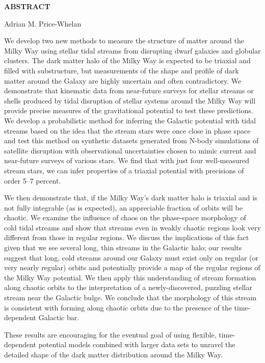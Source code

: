 \thispagestyle{empty}
\begin{center}

{\Large \bf ABSTRACT}

\vspace{.35in}
{\large \bf \thesistitle}

\vspace{.35in}

{\large Adrian M. Price-Whelan} \\
\vspace{.35in}
\end{center}

We develop two new methods to measure the structure of matter around the Milky
Way using stellar tidal streams from disrupting dwarf galaxies and globular
clusters. The dark matter halo of the Milky Way is expected to be triaxial and
filled with substructure, but measurements of the shape and profile of dark
matter around the Galaxy are highly uncertain and often contradictory. We
demonstrate that kinematic data from near-future surveys for stellar streams or
shells produced by tidal disruption of stellar systems around the Milky Way will
provide precise measures of the gravitational potential to test these
predictions. We develop a probabilistic method for inferring the Galactic
potential with tidal streams based on the idea that the stream stars were once
close in phase space and test this method on synthetic datasets generated from
N-body simulations of satellite disruption with observational uncertainties
chosen to mimic current and near-future surveys of various stars. We find that
with just four well-measured stream stars, we can infer properties of a triaxial
potential with precisions of order 5--7 percent.

We then demonstrate that, if the Milky Way's dark matter halo is triaxial and is
not fully integrable (as is expected), an appreciable fraction of orbits will be
chaotic. We examine the influence of chaos on the phase-space morphology of cold
tidal streams and show that streams even in weakly chaotic regions look very
different from those in regular regions. We discuss the implications of this
fact given that we see several long, thin streams in the Galactic halo; our
results suggest that long, cold streams around our Galaxy must exist only on
regular (or very nearly regular) orbits and potentially provide a map of the
regular regions of the Milky Way potential. We then apply this understanding of
stream formation along chaotic orbits to the interpretation of a
newly-discovered, puzzling stellar stream near the Galactic bulge. We conclude
that the morphology of this stream is consistent with forming along chaotic
orbits due to the presence of the time-dependent Galactic bar.

These results are encouraging for the eventual goal of using flexible,
time-dependent potential models combined with larger data sets to unravel the
detailed shape of the dark matter distribution around the Milky Way.
